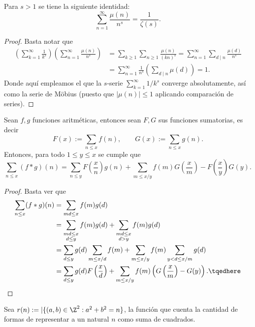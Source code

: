 \documentclass[teoria-numeros.tex]{subfiles}
\begin{document}
\begin{prop}
	Para $s > 1$ se tiene la siguiente identidad:
	$$ \sum_{n=1}^{\infty} \frac{\mu(n)}{n^s} = \frac{1}{\zeta(s)}. $$
\end{prop}
\begin{proof}
	Basta notar que
	\begin{align*}
		\left( \sum_{k=1}^{\infty} \frac{1}{k^s} \right)\left( \sum_{n=1}^{\infty} \frac{\mu(n)}{n^s} \right)
		&= \sum_{k\ge 1} \sum_{n\ge 1} \frac{\mu(n)}{(kn)^s} = \sum_{n=1}^{\infty} \sum_{d\mid n} \frac{\mu(d)}{n^s} \\
		&= \sum_{n=1}^{\infty} \frac{1}{n^s}\left( \sum_{d\mid n} \mu(d) \right) = 1.
	\end{align*}
	Donde aquí empleamos el que la $s$-serie $\sum_{k=1}^{\infty} 1/k^s$ converge absolutamente, así como la serie de Möbius
	(puesto que $|\mu(n)| \le 1$ aplicando comparación de series).
\end{proof}

\begin{lem}
	Sean $f, g$ funciones aritméticas, entonces sean $F, G$ sus funciones sumatorias, es decir
	$$ F(x) := \sum_{n\le x} f(n), \qquad G(x) := \sum_{n\le x} g(n). $$
	Entonces, para todo $1\le y\le x$ se cumple que
	$$ \sum_{n\le x}(f*g)(n) = \sum_{n\le y} F\left( \frac{x}{n} \right) g(n) + \sum_{m \le x/y} f(m) G\left( \frac{x}{m} \right)
	- F\left( \frac{x}{y} \right) G(y). $$
\end{lem}
\begin{proof}
	Basta ver que
	\begin{align}
		\sum_{n\le x}(f*g)(n) &= \sum_{md \le x} f(m)g(d) \notag \\
		&= \sum_{\substack{ md\le x \\ d\le y }} f(m)g(d) + \sum_{\substack{ md\le x \\ d>y }} f(m)g(d) \notag \\
		&= \sum_{d\le y} g(d) \sum_{m \le x/d} f(m) + \sum_{ m \le x/y } f(m) \sum_{y < d \le x/m} g(d) \notag \\
		&= \sum_{d\le y} g(d) F\left( \frac{x}{d} \right) + \sum_{ m \le x/y } f(m)\left( G\left( \frac{x}{m}\right) - G(y) \right). \tqedhere
	\end{align}
\end{proof}

\begin{mydef}
	Sea $r(n) := |\{ (a, b) \in \Z^2 : a^2 + b^2 = n \}$, la función que cuenta la cantidad de formas de representar a un natural $n$ como suma de cuadrados.
\end{mydef}
\end{document}
